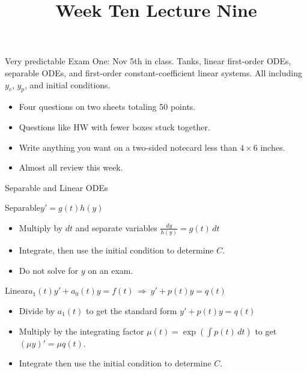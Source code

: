 \documentclass[11pt,aspectratio=169]{beamer}
\title{Week Ten Lecture Nine}
\date{}
\begin{document}
\begin{frame}{Very predictable Exam One: Nov 5th in class.}
Tanks, linear first-order ODEs, separable ODEs, 
and first-order constant-coefficient linear systems.  All including 
$y_c$, $y_p$, and initial conditions. 
  \begin{itemize}
  	\item Four questions on two sheets totaling 50 points.
  	\item Questions like HW with fewer boxes stuck together.
  	\item Write anything you want on a two-sided 
  	notecard less than $4\times6$ inches. 
  	\item Almost all review this week.
  \end{itemize}
\end{frame}
\begin{frame}{Separable and Linear ODEs}
\begin{block}{Separable\quad $y'=g(t)h(y)$}
\begin{itemize}
  \item Multiply by $dt$ and separate variables
  $\frac{dy}{h(y)}=g(t)\,dt$
  \item Integrate, then use the initial condition to determine $C$.
  \item Do not solve for $y$ on an exam. 
\end{itemize}
\end{block}
\begin{block}{Linear\quad $a_1(t)y'+a_0(t)y=f(t)\ \Longrightarrow\ y'+p(t)y=q(t)$}
\begin{itemize}
  \item Divide by $a_1(t)$ to get the 
  standard form $y'+p(t)y=q(t)$ 
  \item Multiply by the integrating factor
  $\mu(t)=\exp\left(\int p(t)\,dt\right)$ to get $(\mu y)'=\mu q(t)$.
  \item Integrate then use the initial condition to determine $C$.
\end{itemize}
\end{block}
\end{frame}
\end{document}
